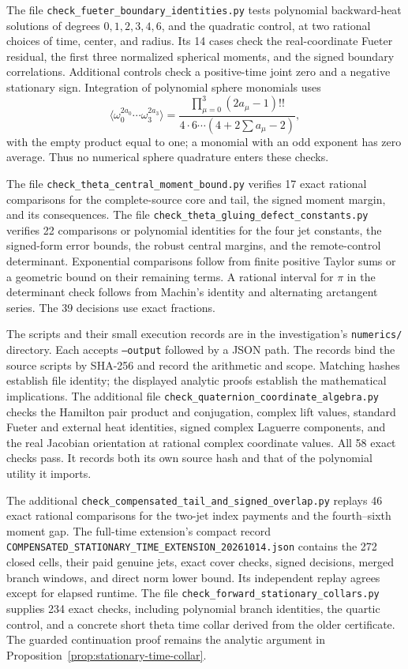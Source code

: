 \documentclass[11pt]{article}
\numberwithin{equation}{section}
\theoremstyle{definition}
\theoremstyle{remark}
\begin{document}
The file \nolinkurl{check_fueter_boundary_identities.py} tests polynomial
backward-heat solutions of degrees $0,1,2,3,4,6$, and the quadratic
control, at two rational choices of time, center, and radius. Its 14
cases check the real-coordinate Fueter residual, the first three
normalized spherical moments, and the signed boundary correlations.
Additional controls check a positive-time joint zero and a negative
stationary sign. Integration of polynomial sphere monomials uses
\[
 \langle\omega_0^{2a_0}\cdots\omega_3^{2a_3}\rangle
 =\frac{\prod_{\mu=0}^3(2a_\mu-1)!!}
 {4\cdot6\cdots(4+2\sum a_\mu-2)},
\]
with the empty product equal to one; a monomial with an odd exponent has
zero average. Thus no numerical sphere quadrature enters these checks.

The file \nolinkurl{check_theta_central_moment_bound.py} verifies 17 exact
rational comparisons for the complete-source core and tail, the signed
moment margin, and its consequences. The file
\nolinkurl{check_theta_gluing_defect_constants.py} verifies 22 comparisons
or polynomial identities for the four jet constants, the signed-form
error bounds, the robust central margins, and the remote-control
determinant. Exponential comparisons follow from finite positive Taylor
sums or a geometric bound on their remaining terms. A rational interval
for $\pi$ in the determinant check follows from Machin's identity and
alternating arctangent series. The 39 decisions use exact fractions.

The scripts and their small execution records are in the investigation's
\texttt{numerics/} directory. Each accepts \texttt{--output} followed by
a JSON path. The records bind the source scripts by SHA-256 and record
the arithmetic and scope. Matching hashes establish file identity;
the displayed analytic proofs establish the mathematical implications.
The additional file \nolinkurl{check_quaternion_coordinate_algebra.py}
checks the Hamilton pair product and conjugation, complex lift values,
standard Fueter and external heat identities, signed complex Laguerre
components, and the real Jacobian orientation at rational complex
coordinate values. All 58 exact checks pass. It records both its own
source hash and that of the polynomial utility it imports.

The additional \nolinkurl{check_compensated_tail_and_signed_overlap.py}
replays 46 exact rational comparisons for the two-jet index payments
and the fourth--sixth moment gap. The full-time extension's compact
record \nolinkurl{COMPENSATED_STATIONARY_TIME_EXTENSION_20261014.json}
contains the 272 closed cells, their paid genuine jets, exact cover
checks, signed decisions, merged branch windows, and direct norm lower
bound. Its independent replay agrees except for elapsed runtime.
The file \nolinkurl{check_forward_stationary_collars.py} supplies 234
exact checks, including polynomial branch identities, the quartic
control, and a concrete short theta time collar derived from the older
certificate. The guarded continuation proof remains the analytic
argument in Proposition~\ref{prop:stationary-time-collar}.
\end{document}
